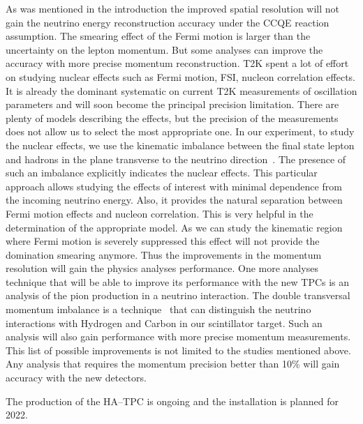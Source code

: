 \documentclass[../main.tex]{subfiles}
\begin{document}
As was mentioned in the introduction the improved spatial resolution will not gain the neutrino energy reconstruction accuracy under the CCQE reaction assumption. The smearing effect of the Fermi motion is larger than the uncertainty on the lepton momentum. But some analyses can improve the accuracy with more precise momentum reconstruction. T2K spent a lot of effort on studying nuclear effects such as Fermi motion, FSI, nucleon correlation effects. It is already the dominant systematic on current T2K measurements of oscillation parameters and will soon become the principal precision limitation. There are plenty of models describing the effects, but the precision of the measurements does not allow us to select the most appropriate one. In our experiment, to study the nuclear effects, we use the kinematic imbalance between the final state lepton and hadrons in the plane transverse to the neutrino direction~\cite{Lu2016}. The presence of such an imbalance explicitly indicates the nuclear effects.
This particular approach allows studying the effects of interest with minimal dependence from the incoming neutrino energy. Also, it provides the natural separation between Fermi motion effects and nucleon correlation. This is very helpful in the determination of the appropriate model. As we can study the kinematic region where Fermi motion is severely suppressed this effect will not provide the domination smearing anymore. Thus the improvements in the momentum resolution will gain the physics analyses performance. One more analyses technique that will be able to improve its performance with the new TPCs is an analysis of the pion production in a neutrino interaction. The double transversal momentum imbalance is a technique~\cite{Lu2015} that can distinguish the neutrino interactions with Hydrogen and Carbon in our scintillator target. Such an analysis will also gain performance with more precise momentum measurements. This list of possible improvements is not limited to the studies mentioned above. Any analysis that requires the momentum precision better than 10\% will gain accuracy with the new detectors.

The production of the HA--TPC is ongoing and the installation is planned for 2022.
\end{document}
